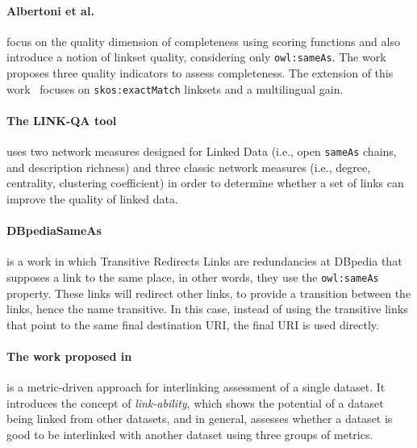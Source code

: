 
\paragraph{Albertoni et al.~\cite{Albertoni:2013:ALQ:2457317.2457327}} focus on the quality dimension of completeness using scoring functions and also introduce a notion of linkset quality, considering only \texttt{owl:sameAs}. The work proposes three quality indicators to assess completeness. The extension of this work~\cite{albertoni2015linkset} focuses on \texttt{skos:exactMatch} linksets and a multilingual gain.

\paragraph{The LINK-QA tool~\cite{Guret2012AssessingLD}} uses two network measures designed for Linked Data (i.e., open \texttt{sameAs} chains, and description richness) and three classic network measures (i.e., degree, centrality, clustering coefficient) in order to determine whether a set of links can improve the quality of linked data.

\paragraph{DBpediaSameAs~\cite{valdestilhasdbpediasameas}} is a work in which Transitive Redirects Links are redundancies at DBpedia that supposes a link to the same place, in other words, they use the \texttt{owl:sameAs} property. These links will redirect other links, to provide a transition between the links, hence the name transitive. In this case, instead of using the transitive links that point to the same final destination URI, the final URI is used directly.

\paragraph{The work proposed in~\cite{yaghouti2015metric}} is a metric-driven approach for interlinking assessment of a single dataset. It introduces the concept of \emph{link-ability}, which shows the potential of a dataset being linked from other datasets, and in general, assesses whether a dataset is good to be interlinked with another dataset using three groups of metrics.

